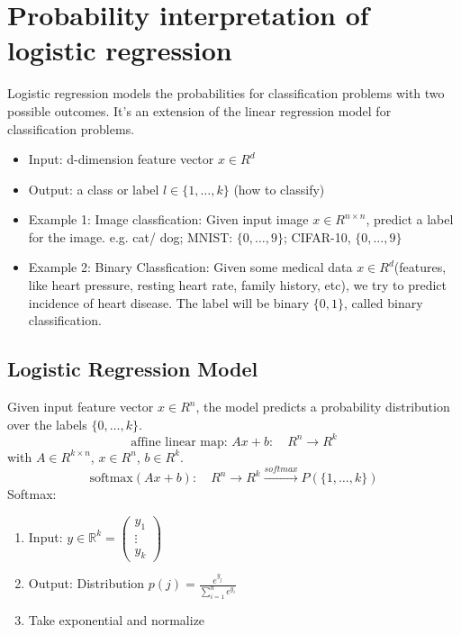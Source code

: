 \section{Probability interpretation of logistic regression}%
Logistic regression models the probabilities for classification problems with two possible outcomes. It's an extension of the linear regression model for classification problems.
\begin{itemize}
\item Input: d-dimension feature vector $x\in R^{d}$
\item Output: a class or label $l \in\{1, \ldots, k\}$ (how to classify)
\item Example 1: Image classfication:\newline
Given input image $x \in R^{n \times n}$, predict a label for the image. e.g. cat/ dog;
MNIST: $\{0, \ldots, 9\}$; CIFAR-10, $\{0, \ldots, 9\}$
\item Example 2: Binary Classfication:\newline
Given some medical data $x\in R^{d}$(features, like heart pressure, resting heart rate, family history, etc), we try to predict incidence of heart disease. The label will be binary $\{0, 1\}$, called binary classification.
\end{itemize}

\subsection{Logistic Regression Model}
Given input feature vector $x\in R^{n}$, the model predicts a probability distribution over the labels $\{0, \ldots, k\}$. 
$$
\mbox{affine linear map: }Ax+b:\quad R^{n} \rightarrow R^{k} 
$$
with $A\in R^{k \times n}$, $x\in R^{n}$, $b\in R^{k}$.
 $$
 \mbox{softmax} \left( Ax+b\right) : \quad R^{n} \rightarrow R^{k} \xrightarrow{softmax}P\left( \{1, \ldots, k\}\right) 
 $$  
Softmax: 
\begin{enumerate}
\item Input: $y \in \mathbb{R}^{k}=\left(\begin{array}{l}y_{1} \\ \vdots \\ y_{k}\end{array}\right)$
\item Output: Distribution $p(j)=\frac{e^{y_{j}}}{\sum_{i=1}^{n} e^{y_{i}}}$ 
\item Take exponential and normalize
\end{enumerate}

